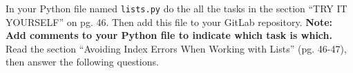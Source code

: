 \documentclass[a4paper,addpoints]{exam}
\begin{document}
\begin{questions}
        \question[10] In your Python file named \texttt{lists.py} do the all the tasks in the section ``TRY IT YOURSELF'' on pg. 46.
            Then add this file to your GitLab repository.
            \textbf{Note: Add comments to your Python file to indicate which task is which.}
        \question[10] Read the section ``Avoiding Index Errors When Working with Lists'' (pg. 46-47), then answer the following questions.
\end{questions}
\begin{center}
    \gradetable[h][questions]
\end{center}
\end{document}
